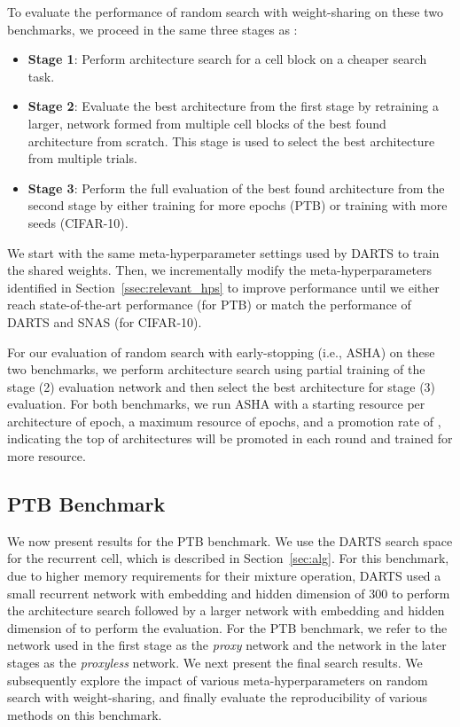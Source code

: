 \documentclass[acmlarge, nonacm]{acmart}
\begin{document}
To evaluate the performance of random search with weight-sharing on these two benchmarks, we proceed in the same three stages as \citet{liu2018darts}:
\begin{itemize}
    \item \textbf{Stage 1}: Perform architecture search for a cell block on a cheaper search task.  
    \item \textbf{Stage 2}: Evaluate the best architecture from the first stage by retraining a larger, network formed from multiple cell blocks of the best found architecture from scratch.  This stage is used to select the best architecture from multiple trials.
    \item \textbf{Stage 3}: Perform the full evaluation of the best found architecture from the second stage by either training for more epochs (PTB) or training with more seeds (CIFAR-10).  
\end{itemize}
We start with the same meta-hyperparameter settings used by DARTS to train the shared weights.  Then, we incrementally modify the meta-hyperparameters identified in Section~\ref{ssec:relevant_hps} to improve performance until we either reach state-of-the-art performance (for PTB) or match the performance of DARTS and SNAS (for CIFAR-10).  

For our evaluation of random search with early-stopping (i.e., ASHA) on these two benchmarks, we perform architecture search using partial training of the stage (2) evaluation network and then select the best architecture for stage (3) evaluation.  For both benchmarks, we run ASHA with a starting resource per architecture of  epoch, a maximum resource of  epochs, and a promotion rate of , indicating the top  of architectures will be promoted in each round and trained for  more resource. 

\subsection{PTB Benchmark}
\label{ssec:rnn}
We now present results for the PTB benchmark.  
We use the DARTS search space for the recurrent cell, which is described in Section~\ref{sec:alg}.  For this benchmark, 
due to higher memory requirements for their mixture operation, DARTS used a small recurrent network with embedding and hidden dimension of 300 to perform the architecture search followed by a larger network with embedding and hidden dimension of  to perform the evaluation.  For the PTB benchmark, we refer to the network used in the first stage as the \emph{proxy} network and the network in the later stages as the \emph{proxyless} network.  
 We next present the final search results. We subsequently explore the impact of various meta-hyperparameters on random search with weight-sharing, and finally evaluate the reproducibility of various methods on this benchmark.
\end{document}
